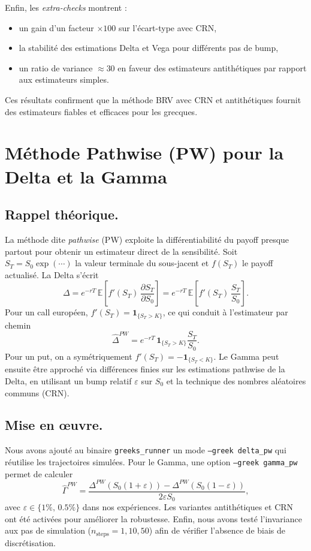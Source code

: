 \documentclass[a4paper,11pt]{article}
\begin{document}
Enfin, les \emph{extra-checks} montrent :
\begin{itemize}
  \item un gain d’un facteur $\times 100$ sur l’écart-type avec CRN,
  \item la stabilité des estimations Delta et Vega pour différents pas de bump,
  \item un ratio de variance $\approx 30$ en faveur des estimateurs antithétiques par rapport aux estimateurs simples.
\end{itemize}
Ces résultats confirment que la méthode BRV avec CRN et antithétiques fournit des estimateurs fiables et efficaces pour les grecques.

\section{Méthode Pathwise (PW) pour la Delta et la Gamma}

\subsection*{Rappel théorique.}  
La méthode dite \emph{pathwise} (PW) exploite la différentiabilité du payoff presque partout pour obtenir un estimateur direct de la sensibilité.  
Soit $S_T = S_0 \exp(\cdots)$ la valeur terminale du sous-jacent et $f(S_T)$ le payoff actualisé. La Delta s’écrit
\[
\Delta = e^{-rT}\,\mathbb{E}\!\left[ f'(S_T)\,\frac{\partial S_T}{\partial S_0} \right]
= e^{-rT}\,\mathbb{E}\!\left[ f'(S_T)\,\frac{S_T}{S_0} \right].
\]
Pour un call européen, $f'(S_T) = \mathbf{1}_{\{S_T > K\}}$, ce qui conduit à l’estimateur par chemin
\[
\widehat{\Delta}^{PW} = e^{-rT}\,\mathbf{1}_{\{S_T > K\}}\frac{S_T}{S_0}.
\]
Pour un put, on a symétriquement $f'(S_T) = -\mathbf{1}_{\{S_T < K\}}$.  
Le Gamma peut ensuite être approché via différences finies sur les estimations pathwise de la Delta, en utilisant un bump relatif $\varepsilon$ sur $S_0$ et la technique des nombres aléatoires communs (CRN).

\subsection*{Mise en \oe uvre.}  
Nous avons ajouté au binaire \texttt{greeks\_runner} un mode \texttt{--greek delta\_pw} qui réutilise les trajectoires simulées. Pour le Gamma, une option \texttt{--greek gamma\_pw} permet de calculer
\[
\widehat{\Gamma}^{PW} = \frac{\Delta^{PW}(S_0(1+\varepsilon)) - \Delta^{PW}(S_0(1-\varepsilon))}{2\varepsilon S_0},
\]
avec $\varepsilon \in \{1\%,\,0.5\%\}$ dans nos expériences. Les variantes antithétiques et CRN ont été activées pour améliorer la robustesse.  
Enfin, nous avons testé l’invariance aux pas de simulation ($n_{\text{steps}}=1,10,50$) afin de vérifier l’absence de biais de discrétisation.
\end{document}

